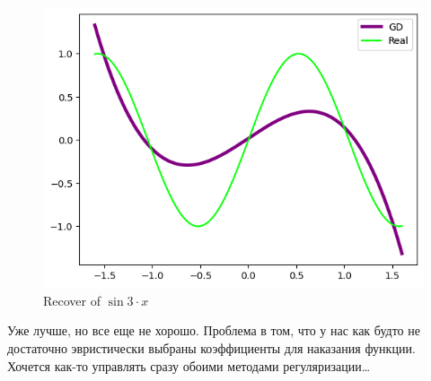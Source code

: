 \documentclass[12pt, a4paper, oneside, final]{article}
\begin{document}
	\begin{figure}[H]
		\centering
		\includegraphics[scale = 1]{Image/AT2_L2_RECOVER.png}
		\caption*{Recover of $\sin{3 \cdot x}$}
	\end{figure}
	Уже лучше, но все еще не хорошо.
	Проблема в том, что у нас как будто не достаточно эвристически выбраны коэффициенты для наказания функции.
	Хочется как-то управлять сразу обоими методами регуляризации\ldots
\end{document}
